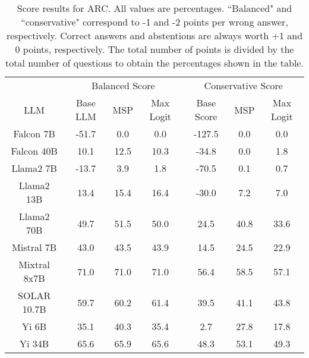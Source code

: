 \renewcommand\arraystretch{1.2}
\begin{table*}
\centering
\begin{tabular}{c|c|c|c|c|c|c}
& \multicolumn{3}{c|}{Balanced Score} & \multicolumn{3}{c}{Conservative Score} \\ 
LLM & Base LLM & MSP & Max Logit & Base Score & MSP & Max Logit\\ \hline
Falcon 7B & -51.7 & 0.0 & 0.0 & -127.5 & 0.0 & 0.0\\
Falcon 40B & 10.1 & 12.5 & 10.3 & -34.8 & 0.0 & 1.8\\
Llama2 7B & -13.7 & 3.9 & 1.8 & -70.5 & 0.1 & 0.7\\
Llama2 13B & 13.4 & 15.4 & 16.4 & -30.0 & 7.2 & 7.0\\
Llama2 70B & 49.7 & 51.5 & 50.0 & 24.5 & 40.8 & 33.6\\
Mistral 7B & 43.0 & 43.5 & 43.9 & 14.5 & 24.5 & 22.9\\
Mixtral 8x7B & 71.0 & 71.0 & 71.0 & 56.4 & 58.5 & 57.1\\
SOLAR 10.7B & 59.7 & 60.2 & 61.4 & 39.5 & 41.1 & 43.8\\
Yi 6B & 35.1 & 40.3 & 35.4 & 2.7 & 27.8 & 17.8\\
Yi 34B & 65.6 & 65.9 & 65.6 & 48.3 & 53.1 & 49.3\\
\hline
\end{tabular}
\caption{Score results for ARC. All values are percentages. ``Balanced" and ``conservative" correspond to -1 and -2 points per wrong answer, respectively. Correct answers and abstentions are always worth +1 and 0 points, respectively. The total number of points is divided by the total number of questions to obtain the percentages shown in the table.}
\label{tab:arc_score}
\end{table*}
